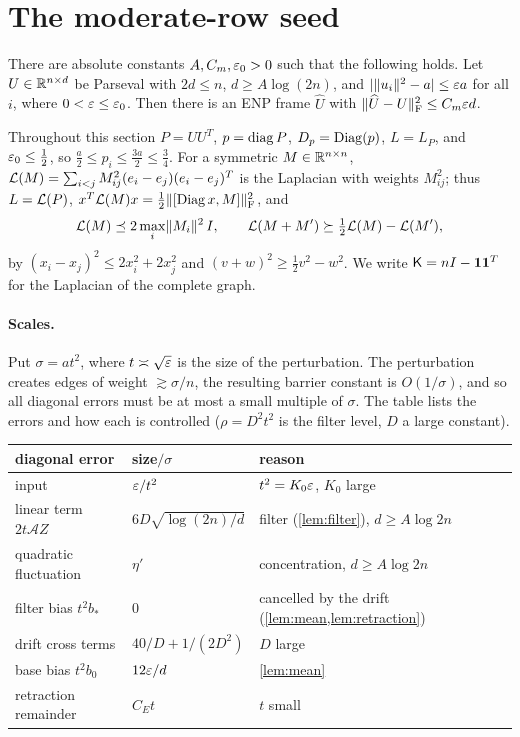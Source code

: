\section{The moderate-row seed}\label{sec:moderate}

\begin{theorem}\label{thm:moderate}
There are absolute constants $A,C_m,\varepsilon_0>0$ such that the following holds.
Let $U\in\mathbb R^{n\times d}$ be Parseval with $2d\le n$, $d\ge A\log(2n)$, and
$|\lVert u_i\rVert^2-a|\le\varepsilon a$ for all $i$, where $0<\varepsilon\le\varepsilon_0$. Then there is
an ENP frame $\widehat U$ with $\lVert \widehat U-U\rVert_{\mathrm F}^2\le C_m\varepsilon d$.
\end{theorem}

Throughout this section $P=UU^T$, $p=\operatorname{diag} P$, $D_p=\operatorname{Diag}(p)$, $L=L_P$, and
$\varepsilon_0\le\frac12$, so $\frac a2\le p_i\le\frac{3a}2\le\frac34$. For a symmetric
$M\in\mathbb R^{n\times n}$, $\mathcal L(M)=\sum_{i<j}M_{ij}^2(e_i-e_j)(e_i-e_j)^T$ is the
Laplacian with weights $M_{ij}^2$; thus $L=\mathcal L(P)$,
$x^T\mathcal L(M)x=\frac12\lVert [\operatorname{Diag} x,M]\rVert_{\mathrm F}^2$, and
\begin{equation}\label{eq:lap-basic}
 \mathcal L(M)\preceq2\max_i\lVert M_i\rVert^2\,I,\qquad
 \mathcal L(M+M')\succeq\tfrac12\mathcal L(M)-\mathcal L(M'),
\end{equation}
by $(x_i-x_j)^2\le2x_i^2+2x_j^2$ and $(v+w)^2\ge\frac12v^2-w^2$. We write
$\mathsf K=nI-\mathbf 1\mathbf 1^T$ for the Laplacian of the complete graph.

\paragraph{Scales.} Put $\sigma=at^2$, where $t\asymp\sqrt{\varepsilon}$ is the size of
the perturbation. The perturbation creates edges of weight $\gtrsim\sigma/n$,
the resulting barrier constant is $O(1/\sigma)$, and so all diagonal errors must
be at most a small multiple of $\sigma$. The table lists the errors and how
each is controlled ($\rho=D^2t^2$ is the filter level, $D$ a large constant).
\begin{center}
\small
\begin{tabular}{@{}lll@{}}
\toprule
diagonal error & size$/\sigma$ & reason\\
\midrule
input & $\varepsilon/t^2$ & $t^2=K_0\varepsilon$, $K_0$ large\\
linear term $2t\mathcal AZ$ & $6D\sqrt{\log(2n)/d}$ & filter (\cref{lem:filter}), $d\ge A\log 2n$\\
quadratic fluctuation & $\eta'$ & concentration, $d\ge A\log 2n$\\
filter bias $t^2b_*$ & $0$ & cancelled by the drift (\cref{lem:mean,lem:retraction})\\
drift cross terms & $40/D+1/(2D^2)$ & $D$ large\\
base bias $t^2b_0$ & $12\varepsilon/d$ & \cref{lem:mean}\\
retraction remainder & $C_Et$ & $t$ small\\
\bottomrule
\end{tabular}
\end{center}

